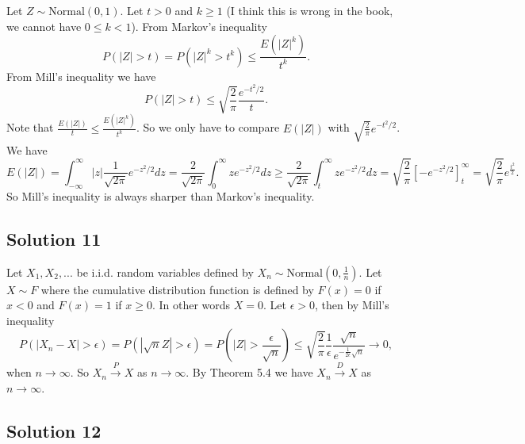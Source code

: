 Let $Z \sim \mathrm{Normal}(0, 1)$.
Let $t > 0$ and $k \geq 1$ (I think this is wrong in the book, we cannot have $0 \leq k < 1$).
From Markov's inequality
\begin{equation*}
    P(|Z| > t) = P(|Z|^k > t^k)
        \leq \frac{E(|Z|^k)}{t^k}.
\end{equation*}
From Mill's inequality we have
\begin{equation*}
    P(|Z| > t) \leq \sqrt{\frac{2}{\pi}} \frac{e^{-t^2/2}}{t}.
\end{equation*}
Note that $\frac{E(|Z|)}{t} \leq \frac{E(|Z|^k)}{t^k}$.
So we only have to compare $E(|Z|)$ with $\sqrt{\frac{2}{\pi}} e^{-t^2/2}$.
We have
\begin{equation*}
    E(|Z|) = \int_{-\infty}^{\infty} |z| \frac{1}{\sqrt{2\pi}} e^{-z^2/2} dz
        = \frac{2}{\sqrt{2\pi}} \int_0^{\infty} z e^{-z^2/2} dz
        \geq \frac{2}{\sqrt{2\pi}} \int_t^{\infty} z e^{-z^2/2} dz
        = \sqrt{\frac{2}{\pi}} \left[ -e^{-z^2/2} \right]_{t}^{\infty}
        = \sqrt{\frac{2}{\pi}} e^{\frac{t^2}{2}}.
\end{equation*}
So Mill's inequality is always sharper than Markov's inequality.


\subsection*{Solution 11}

Let $X_1, X_2, ...$ be i.i.d. random variables defined by $X_n \sim \mathrm{Normal}(0, \frac{1}{n})$.
Let $X \sim F$ where the cumulative distribution function is defined by $F(x) = 0$ if $x < 0$ and $F(x) = 1$ if $x \geq 0$.
In other words $X = 0$.
Let $\epsilon > 0$, then by Mill's inequality
\begin{equation*}
    P(|X_n - X| > \epsilon) = P(|\sqrt{n} Z| > \epsilon)
        = P(|Z| > \frac{\epsilon}{\sqrt{n}})
        \leq \sqrt{\frac{2}{\pi}} \frac{1}{\epsilon} \frac{\sqrt{n}}{e^{-\frac{1}{2\epsilon} \sqrt{n}}}
        \to 0,
\end{equation*}
when $n \to \infty$.
So $X_n \xrightarrow{P} X$ as $n \to \infty$.
By Theorem 5.4 we have $X_n \xrightarrow{D} X$ as $n \to \infty$.


\subsection*{Solution 12}

